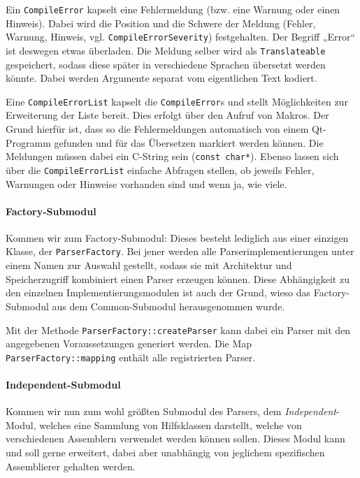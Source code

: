 Ein \texttt{CompileError} kapselt eine Fehlermeldung (bzw. eine Warnung oder
einen Hinweis). Dabei wird die Position und die Schwere der Meldung (Fehler,
Warnung, Hinweis, vgl. \texttt{Compile\-Error\-Severity}) festgehalten. Der Begriff
„Error“ ist deswegen etwas überladen. Die Meldung selber wird als
\texttt{Translateable} gespeichert, sodass diese später in verschiedene Sprachen
übersetzt werden könnte. Dabei werden Argumente separat vom eigentlichen
Text kodiert.

Eine \texttt{CompileErrorList} kapselt die
\texttt{CompileError}s und stellt Möglichkeiten zur Erweiterung der Liste
bereit. Dies erfolgt über den Aufruf von Makros. Der Grund hierfür ist, dass so
die Fehlermeldungen automatisch von einem Qt-Programm gefunden und für das
Übersetzen markiert werden können. Die Meldungen müssen dabei ein C-String sein
(\texttt{const char*}). Ebenso lassen sich über die \texttt{CompileErrorList}
einfache Abfragen stellen, ob jeweils Fehler, Warnungen oder Hinweise vorhanden
sind und wenn ja, wie viele.

\paragraph{Factory-Submodul}

Kommen wir zum Factory-Submodul: Dieses besteht lediglich aus einer einzigen
Klasse, der \texttt{ParserFactory}. Bei jener werden alle
Parserimplementierungen unter einem Namen zur Auswahl gestellt, sodass sie mit
Architektur und Speicherzugriff kombiniert einen Parser erzeugen können. Diese
Abhängigkeit zu den einzelnen Implementierungsmodulen ist auch der Grund, wieso
das Factory-Submodul aus dem Common-Submodul herausgenommen wurde.

Mit der Methode \texttt{ParserFactory::createParser} kann dabei ein Parser mit
den angegebenen Voraussetzungen generiert werden. Die Map
\texttt{ParserFactory::mapping} enthält alle registrierten Parser.

\paragraph{Independent-Submodul}

Kommen wir nun zum wohl größten Submodul des Parsers, dem
\emph{Independent}-Modul, welches eine Sammlung von Hilfsklassen darstellt,
welche von verschiedenen Assemblern verwendet werden können sollen. Dieses Modul
kann und soll gerne erweitert, dabei aber unabhängig von jeglichem spezifischen
Assemblierer gehalten werden.

